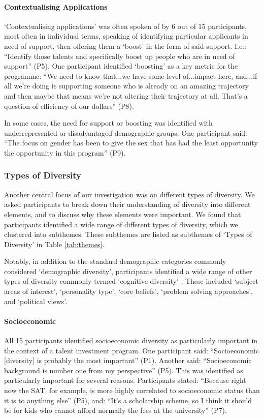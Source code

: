 \paragraph{Contextualising Applications}
`Contextualising applications' was often spoken of by 6 out of 15 participants, most often in individual terms, speaking of identifying particular applicants in need of support, then offering them a `boost' in the form of said support. I.e.: ``Identify those talents and specifically boost up people who are in need of support'' (P5). One participant identified `boosting' as a key metric for the programme: ``We need to know that...we have some level of...impact here, and...if all we're doing is supporting someone who is already on an amazing trajectory and then maybe that means we're not altering their trajectory at all. That's a question of efficiency of our dollars'' (P8).

In some cases, the need for support or boosting was identified with underrepresented or disadvantaged demographic groups. One participant said: ``The focus on gender has been to give the sex that has had the least opportunity the opportunity in this program'' (P9).

\subsubsection{Types of Diversity}
Another central focus of our investigation was on different types of diversity. We asked participants to break down their understanding of diversity into different elements, and to discuss why these elements were important. We found that participants identified a wide range of different types of diversity, which we clustered into subthemes. These subthemes are listed as subthemes of `Types of Diversity' in Table \ref{tab:themes}.

Notably, in addition to the standard demographic categories commonly considered `demographic diversity', participants identified a wide range of other types of diversity commonly termed `cognitive diversity' \cite{page_diversity_2010}. These included `subject areas of interest', `personality type', `core beliefs', `problem solving approaches', and `political views'.

\paragraph{Socioeconomic}
All 15 participants identified socioeconomic diversity as particularly important in the context of a talent investment program. One participant said: ``Socioeconomic [diversity] is probably the most important'' (P1). Another said: ``Socioeconomic background is number one from my perspective'' (P5). This was identified as particularly important for several reasons. Participants stated: ``Because right now the SAT, for example, is more highly correlated to socioeconomic status than it is to anything else'' (P5), and: ``It's a scholarship scheme, so I think it should be for kids who cannot afford normally the fees at the university'' (P7).

